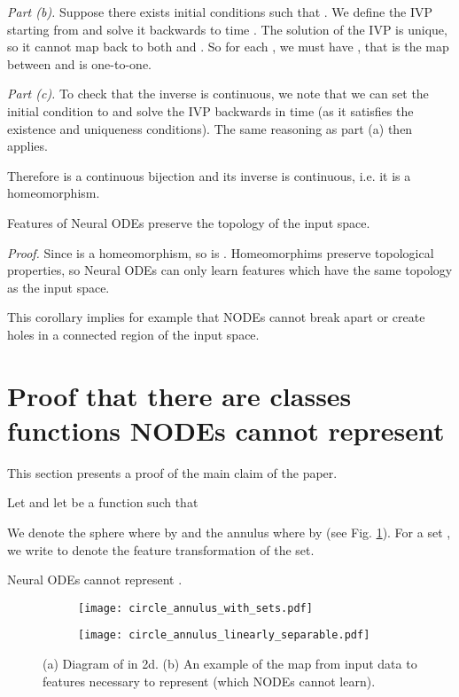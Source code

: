 \documentclass{article}
\begin{document}
\textit{Part (b).} Suppose there exists initial conditions  such that . We define the IVP starting from  and solve it backwards to time . The solution of the IVP is unique, so it cannot map  back to both  and . So for each , we must have , that is the map between  and  is one-to-one.

\textit{Part (c).} To check that the inverse  is continuous, we note that we can set the initial condition to  and solve the IVP backwards in time (as it satisfies the existence and uniqueness conditions). The same reasoning as part (a) then applies.

Therefore  is a continuous bijection and its inverse is continuous, i.e. it is a homeomorphism. 

\begin{corollary*}
Features of Neural ODEs preserve the topology of the input space.
\end{corollary*}

\textit{Proof.} Since  is a homeomorphism, so is . Homeomorphims preserve topological properties, so Neural ODEs can only learn features which have the same topology as the input space.

This corollary implies for example that NODEs cannot break apart or create holes in a connected region of the input space.

\section{Proof that there are classes functions NODEs cannot represent} \label{proof-nd-example}

This section presents a proof of the main claim of the paper.

Let  and let  be a function such that



We denote the sphere where  by  and the annulus where  by  (see Fig. \ref{thm-explanation-fig}). For a set , we write  to denote the feature transformation of the set.

\begin{customprop}{2} Neural ODEs cannot represent .
\end{customprop}

\begin{figure}[t]
\centering
\begin{subfigure}[t]{0.2\linewidth}
\centering
\texttt{[image: circle\_annulus\_with\_sets.pdf]}
\caption{}
\end{subfigure} \hspace{0.1\linewidth}
\begin{subfigure}[t]{0.45\linewidth}
\centering
\texttt{[image: circle\_annulus\_linearly\_separable.pdf]}
\caption{}
\end{subfigure}
\caption{(a) Diagram of  in 2d. (b) An example of the map  from input data to features necessary to represent  (which NODEs cannot learn).}
\label{thm-explanation-fig}
\end{figure}
\end{document}
